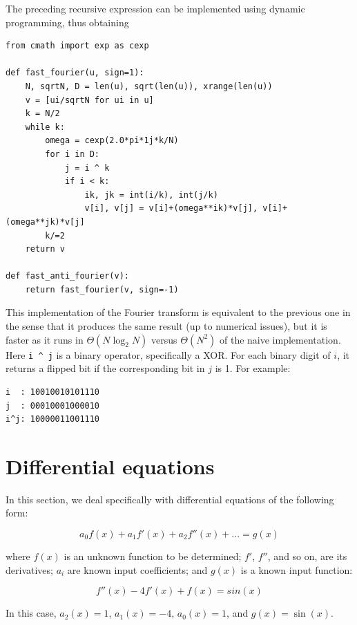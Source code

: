 \documentclass[justified,sixbynine]{tufte-book}
\theoremstyle{plain}%
\theoremstyle{definition}
\theoremstyle{remark}
\begin{document}
\begin{fullwidth}
The preceding recursive expression can be implemented using dynamic programming, thus obtaining


\begin{lstlisting}
from cmath import exp as cexp

def fast_fourier(u, sign=1):
    N, sqrtN, D = len(u), sqrt(len(u)), xrange(len(u))
    v = [ui/sqrtN for ui in u]
    k = N/2
    while k:
        omega = cexp(2.0*pi*1j*k/N)
        for i in D:
            j = i ^ k
            if i < k:
                ik, jk = int(i/k), int(j/k)
                v[i], v[j] = v[i]+(omega**ik)*v[j], v[i]+(omega**jk)*v[j]
        k/=2
    return v

def fast_anti_fourier(v):
    return fast_fourier(v, sign=-1)
\end{lstlisting}

This implementation of the Fourier transform is equivalent to the previous one in the sense that it produces the same result (up to numerical issues), but it is faster as it runs in $\Theta(N \log_2 N)$ versus $\Theta(N^2)$ of the naive implementation. Here \verb!i ^ j!
is a binary operator, specifically a XOR. For each binary digit of $i$, it returns a flipped bit if the corresponding bit in $j$ is 1. For example:

\begin{lstlisting}
i  : 10010010101110
j  : 00010001000010
i^j: 10000011001110
\end{lstlisting}

\section{Differential equations}

In this section, we deal specifically with differential equations of the following form:

\begin{equation}
a_0 f(x) + a_1 f'(x) + a_2 f''(x) + ... = g(x) \label{diffeq}
\end{equation}

where $f(x)$ is an unknown function to be determined; $f'$, $f''$, and so on, are its derivatives; $a_i$ are known input coefficients; and $g(x)$ is a known input function:

\begin{equation}
f''(x) - 4 f'(x) + f(x) = sin(x)
\end{equation}

In this case, $a_2(x) = 1$, $a_1(x) = -4$, $a_0(x) = 1$, and $g(x) = \sin(x)$.


\end{fullwidth}
\end{document}
